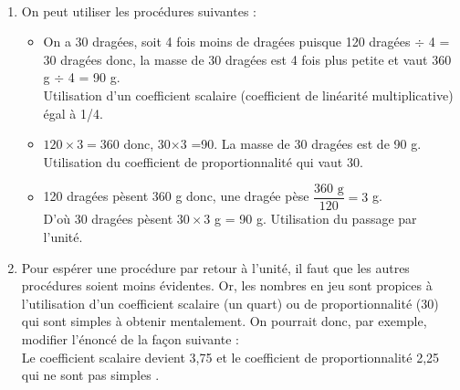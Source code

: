 \begin{corrige}
\ \\ [-5mm]
\begin{enumerate}
   \item On peut utiliser les procédures suivantes :
      \begin{itemize}
         \item On a 30 dragées, soit 4 fois moins de dragées puisque 120 dragées $\div$ 4 = 30 dragées donc, la masse de 30 dragées est 4 fois plus petite et vaut 360 g $\div$ 4 = 90 g. \\
            Utilisation d'un coefficient scalaire (coefficient de linéarité multiplicative) égal à 1/4.
         \item $120\times3 =360$ donc, 30$\times$3 =90. La masse de 30 dragées est de 90 g. \\
            Utilisation du coefficient de proportionnalité qui vaut 30.
         \item 120 dragées pèsent 360 g donc, une dragée pèse $\dfrac{360\text{ g}}{120} =3$ g. \\
            D'où 30 dragées pèsent $30\times3$ g = 90 g. Utilisation du passage par l'unité.
      \end{itemize}
   \item Pour \og espérer \fg{} une procédure par retour à l'unité, il faut que les autres procédures soient moins évidentes. Or, les nombres en jeu sont propices à l'utilisation d'un coefficient scalaire (un quart) ou de proportionnalité (30) qui sont simples à obtenir mentalement. On pourrait donc, par exemple, modifier l'énoncé de la façon suivante : 
   \medskip
    \\
      Le coefficient scalaire devient 3,75 et le coefficient de proportionnalité 2,25 qui ne sont pas \og simples \fg. 
\end{enumerate}
\end{corrige}

\bigskip

